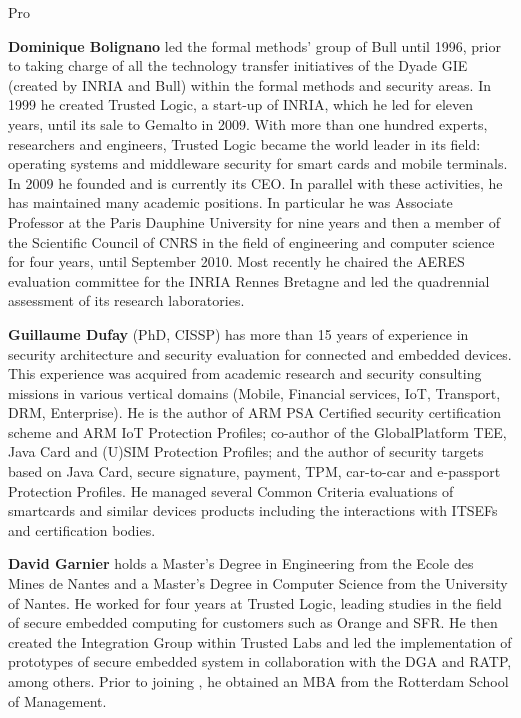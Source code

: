 \begin{sitedescription}{Pro}
\begin{compactitem} %

\item {\bf Dominique Bolignano} led the formal methods'
  group of Bull until 1996, prior to taking charge of all the
  technology transfer initiatives of the Dyade GIE (created by INRIA
  and Bull) within the formal methods and security areas. In 1999 he
  created Trusted Logic, a start-up of INRIA, which he led for eleven
  years, until its sale to Gemalto in 2009. With more than one hundred
  experts, researchers and engineers, Trusted Logic became the world
  leader in its field: operating systems and middleware security for
  smart cards and mobile terminals. In 2009 he founded \provenrun{} and
  is currently its CEO. In parallel with these activities, he has
  maintained many academic positions. In particular he was Associate
  Professor at the Paris Dauphine University for nine years and then a
  member of the Scientific Council of CNRS in the field of engineering
  and computer science for four years, until September 2010. Most
  recently he chaired the AERES evaluation committee for the INRIA
  Rennes Bretagne and led the quadrennial assessment of its research
  laboratories.

\item {\bf Guillaume Dufay} (PhD, CISSP) has more than 15 years of
  experience in security architecture and security evaluation for
  connected and embedded devices. This experience was acquired from
  academic research and security consulting missions in various
  vertical domains (Mobile, Financial services, IoT, Transport, DRM,
  Enterprise). He is the author of ARM PSA Certified security
  certification scheme and ARM IoT Protection Profiles; co-author of
  the GlobalPlatform TEE, Java Card and (U)SIM Protection Profiles;
  and the author of security targets based on Java Card, secure
  signature, payment, TPM, car-to-car and e-passport Protection
  Profiles. He managed several Common Criteria evaluations of
  smartcards and similar devices products including the interactions
  with ITSEFs and certification bodies.

\item {\bf David Garnier} holds a Master's Degree in Engineering from
  the Ecole des Mines de Nantes and a Master's Degree in Computer
  Science from the University of Nantes. He worked for four years at
  Trusted Logic, leading studies in the field of secure embedded
  computing for customers such as Orange and SFR. He then created the
  Integration Group within Trusted Labs and led the implementation of
  prototypes of secure embedded system in collaboration with the DGA
  and RATP, among others. Prior to joining \provenrun{}, he obtained an
  MBA from the Rotterdam School of Management.


\end{compactitem}
\end{sitedescription}
